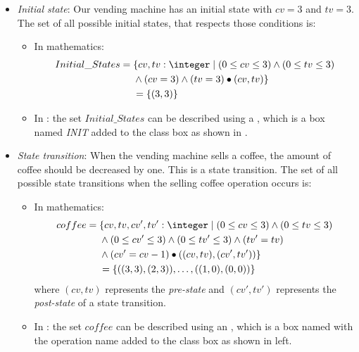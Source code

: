\begin{itemize}
\item \textit{Initial state}: Our vending machine has an initial state with $cv = 3$ and $tv = 3$. The set of all possible initial states, that respects those conditions is:  
\begin{itemize}
\item In mathematics:
\begin{equation*}
\begin{aligned}
Initial\_States ={} & \{cv,tv: \integer\mid (0 \leq  cv \leq 3) \wedge (0 \leq  tv \leq 3)\\
      & \wedge (cv = 3) \wedge (tv = 3)\bullet(cv,tv)\} \\
      &  =\{\pair{3}{3}\}
\end{aligned}
\end{equation*}
\item In \oz{}: the set $Initial\_States$ can be described using a , which is a box named \textit{I\scriptsize{NIT}} added to the class box  as shown in .
\end{itemize}


\item \textit{State transition}: When the vending machine sells a coffee, the amount of coffee should be decreased by one. This is a state transition.
The set of all possible state transitions when the selling coffee operation occurs is:
\begin{itemize}
\item In mathematics:
\begin{equation*}
\begin{aligned}
coffee ={} & \{cv,tv,cv',tv': \integer\mid (0 \leq  cv \leq 3) \wedge (0 \leq  tv \leq 3)\\
      & \wedge (0 \leq  cv' \leq 3) \wedge (0 \leq  tv' \leq 3)\wedge (tv' = tv)  \\
      & \wedge (cv' = cv - 1) \bullet\pair{\pair{cv}{tv}}{\pair{cv'}{tv'}}\} \\
      & =\{\pair{\pair{3}{3}}{\pair{2}{3}},\dots,\pair{\pair{1}{0}}{\pair{0}{0}}\}
\end{aligned}
\end{equation*}
 where $(cv,tv)$ represents the \textit{pre-state} and $(cv',tv')$ represents the \textit{post-state} of a state transition.
\item In \oz{}: the set $coffee$ can be described using an , which is a box named with the operation name added to the class box as shown in  left.
\end{itemize}


\end{itemize}

